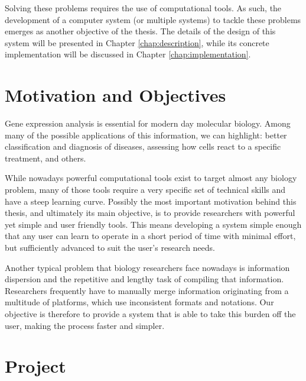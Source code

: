 Solving these problems requires the use of computational tools. As such, the
development of a computer system (or multiple systems) to tackle these problems
emerges as another objective of the thesis. The details of the design of this
system will be presented in Chapter \ref{chap:description}, while its concrete
implementation will be discussed in Chapter \ref{chap:implementation}.

\section{Motivation and Objectives} \label{sec:motivation}


Gene expression analysis is essential for modern day molecular biology. Among
many of the possible applications of this information, we can highlight: better
classification and diagnosis of diseases, assessing how cells react to a
specific treatment, and others.

While nowadays powerful computational tools exist to target almost any biology
problem, many of those tools require a very specific set of technical skills and
have a steep learning curve. Possibly the most important motivation behind this
thesis, and ultimately its main objective, is to provide researchers with
powerful yet simple and user friendly tools. This means developing a system
simple enough that any user can learn to operate in a short period of time with
minimal effort, but sufficiently advanced to suit the user's research needs.

Another typical problem that biology researchers face nowadays is information
dispersion and the repetitive and lengthy task of compiling that information.
Researchers frequently have to manually merge information originating from a
multitude of platforms, which use inconsistent formats and notations. Our
objective is therefore to provide a system that is able to take this burden off
the user, making the process faster and simpler.

\section{Project} \label{sec:project}

